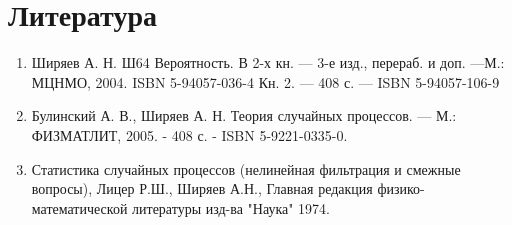 \documentclass[12pt]{article}
\begin{document}
\section{Литература}

\begin{enumerate}

\item Ширяев А. Н. Ш64 Вероятность. В 2-х кн. –– 3-е изд., перераб. и доп. ––М.: МЦНМО, 2004. ISBN 5-94057-036-4 Кн. 2. –– 408 с. –– ISBN 5-94057-106-9

\item Булинский А. В., Ширяев А. Н. Теория случайных процессов. — М.: ФИЗМАТЛИТ, 2005. - 408 с. - ISBN 5-9221-0335-0.

\item Статистика случайных процессов (нелинейная фильтрация и смежные вопросы), Лицер Р.Ш., Ширяев А.Н., Главная редакция физико-математической литературы изд-ва "Наука" 1974.

\end{enumerate}
\end{document}
